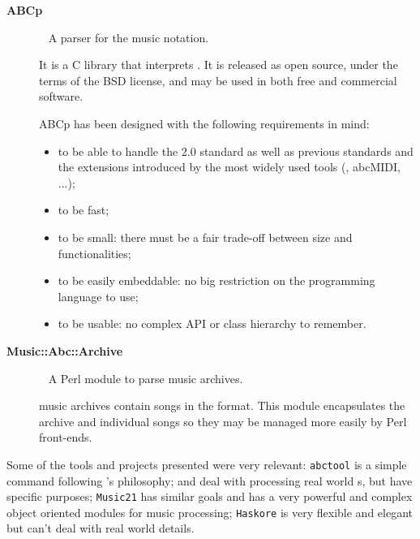 \begin{description}
  \item[\textbf{ABCp}]~\cite{abcp:Online}
    A parser for the \abc{} music notation.

    It is a C library that interprets \abc{}. It is released as open source, under the terms of the
    BSD license, and may be used in both free and commercial software.

    ABCp has been designed with the following requirements in mind:
    \begin{itemize}
      \item to be able to handle the \abc{} 2.0 standard as well as previous standards and the
      extensions introduced by the most widely used tools (\abcmtops{}, abcMIDI, ...);
      \item to be fast;
      \item to be small: there must be a fair trade-off between size and functionalities;
      \item to be easily embeddable: no big restriction on the programming language to use;
      \item to be usable: no complex API or class hierarchy to remember.
    \end{itemize}

  \item[\textbf{Music::Abc::Archive}]~\cite{music_abc_archive:Online}
    A Perl module to parse \abc{} music archives.

    \abc{} music archives contain songs in the \abc{} format. This module encapsulates the \abc{}
    archive and individual songs so they may be managed more easily by Perl front-ends.

\end{description}

Some of the tools and projects presented were very relevant: \texttt{abctool} is a simple command
following \unix{}'s philosophy; \abctomidi{} and \abcmtops{} deal with processing real world \abc{}s,
but have specific purposes; \texttt{Music21} has similar goals and has a very powerful and complex
object oriented modules for music processing; \texttt{Haskore} is very flexible and elegant but
can't deal with real world \abc{} details.
